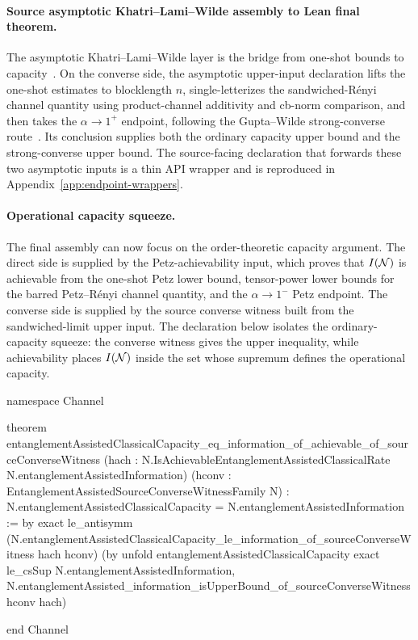 \documentclass[10pt,a4paper]{article}
\newif\ifqitLineFocused
\newcommand{\qitHighlightSpan}[2]{%
	\ifnum\value{lstnumber}<#1\relax
	\else
		\ifnum\value{lstnumber}>#2\relax
		\else
			\qitLineFocusedtrue
		\fi
	\fi
}
\begin{document}
\paragraph{Source asymptotic Khatri--Lami--Wilde assembly to Lean final theorem.}
The asymptotic Khatri--Lami--Wilde layer is the bridge from one-shot bounds to
capacity~\cite{KhatriLamiWilde2025Principles}.  On the converse side, the
asymptotic upper-input declaration lifts the one-shot estimates to blocklength $n$,
single-letterizes the sandwiched-R\'enyi channel quantity using product-channel
additivity and cb-norm comparison, and then takes the $\alpha\to1^{+}$
endpoint, following the Gupta--Wilde strong-converse route~\cite{GuptaWilde2013,KhatriLamiWilde2025Principles}.  Its conclusion supplies
both the ordinary capacity upper bound and the strong-converse upper bound.
The source-facing declaration that forwards these two asymptotic inputs is a
thin API wrapper and is reproduced in
Appendix~\ref{app:endpoint-wrappers}.

\paragraph{Operational capacity squeeze.}
The final assembly can now focus on the order-theoretic capacity argument.  The
direct side is supplied by the Petz-achievability input, which proves that
$I({\cal N})$ is achievable from the one-shot Petz lower bound, tensor-power
lower bounds for the barred Petz--R\'enyi channel quantity, and the
$\alpha\to1^{-}$ Petz endpoint.  The converse side is supplied by the
source converse witness built from the sandwiched-limit upper input.  The
declaration below isolates the ordinary-capacity squeeze: the converse witness
gives the upper inequality, while achievability places $I({\cal N})$ inside the set
whose supremum defines the operational capacity.
	
\begin{qitleancode}[title={EA capacity squeeze},
qit focus={\qitHighlightSpan{5}{9}}]
namespace Channel

theorem entanglementAssistedClassicalCapacity_eq_information_of_achievable_of_sourceConverseWitness
    (hach :
      N.IsAchievableEntanglementAssistedClassicalRate
        N.entanglementAssistedInformation)
    (hconv : EntanglementAssistedSourceConverseWitnessFamily N) :
    N.entanglementAssistedClassicalCapacity =
      N.entanglementAssistedInformation := by
  exact le_antisymm
    (N.entanglementAssistedClassicalCapacity_le_information_of_sourceConverseWitness
      hach hconv)
    (by
      unfold entanglementAssistedClassicalCapacity
      exact le_csSup
        \langle N.entanglementAssistedInformation,
          N.entanglementAssisted_information_isUpperBound_of_sourceConverseWitness hconv\rangle
        hach)

end Channel
\end{qitleancode}
	
\end{document}
